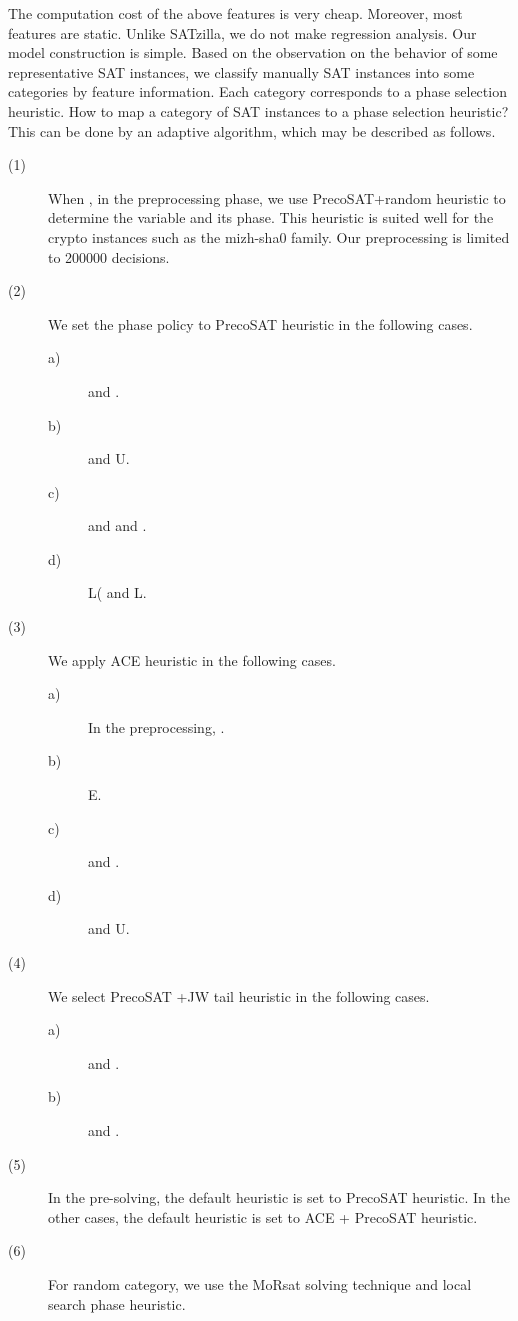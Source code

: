 \documentclass{llncs}
\begin{document}
The computation cost of the above features is very cheap. Moreover,
most features are static. Unlike SATzilla, we do not make regression
analysis. Our model construction is simple. Based on the observation
on the behavior of some representative SAT instances, we classify
manually SAT instances into some categories by feature information.
Each category corresponds to a phase selection heuristic. How to map
a category of SAT instances to a phase selection heuristic? This can
be done by an adaptive algorithm, which may be described as follows.

\begin{description}
\item [(1)] When , in the preprocessing phase, we use
PrecoSAT+random heuristic to determine the variable and its phase.
This heuristic is suited well for the crypto instances such as the
mizh-sha0 family. Our preprocessing is limited to 200000 decisions.

\item [(2)] We set the phase policy to PrecoSAT heuristic in the following
cases.
\begin{description}
\item [a)]  and .
\item [b)]  and U.
\item [c)]  and  and .
\item [d)] L( and L.
\end{description}

 \item [(3)] We apply ACE heuristic in the following cases.
\begin{description}
\item [a)] In the preprocessing, .
\item [b)] E.
\item [c)]  and .
\item [d)]  and U.
\end{description}

\item [(4)] We select PrecoSAT +JW tail heuristic in the following cases.
\begin{description}
\item [a)]  and .
\item [b)]  and .
\end{description}

\item [(5)] In the pre-solving, the default heuristic is set to PrecoSAT
heuristic. In the other cases, the default heuristic is set to ACE +
PrecoSAT heuristic.

 \item [(6)] For random category, we use the MoRsat \cite {MoRsat:15} solving technique and
 local search phase heuristic.

\end{description}
\end{document}
